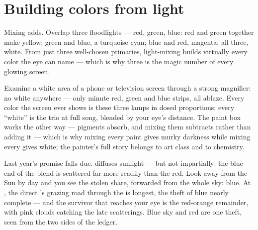 \section{Building colors from light}

\begin{example}\label{ex:g8:colors-spectra:additive}
Mixing \emph{} adds. Overlap three floodlights --- red,
green, blue: red and green together make yellow; green and
blue, a turquoise cyan; blue and red, magenta; all three,
white. From just three well-chosen primaries, light-mixing
builds virtually every color the eye can name --- which is why
three is the magic number of every glowing screen.
\end{example}

\begin{example}\label{ex:g8:colors-spectra:screen}
Examine a white area of a phone or television screen through a
strong magnifier: no white anywhere --- only minute red, green
and blue strips, all ablaze. Every color the screen ever
shows is these three lamps in dosed proportions; every
``white'' is the trio at full song, blended by your eye's
distance. The paint box works the other way --- pigments
absorb, and mixing them subtracts  rather than adding it
--- which is why mixing every paint gives murky darkness while
mixing every  gives white; the painter's full story
belongs to art class and to chemistry.
\end{example}

\begin{remark}\label{rem:g8:colors-spectra:sunset}
Last year's  promise falls due.  diffuses sunlight
--- but not impartially: the blue end of the blend is
scattered far more readily than the red. Look away from the
Sun by day and you see the stolen share, forwarded from the
whole sky: blue. At , the direct 's grazing road
through the  is longest, the theft of blue nearly
complete --- and the survivor that reaches your eye is the
red-orange remainder, with pink clouds catching the late
scatterings. Blue sky and red  are one theft, seen from
the two sides of the ledger.
\end{remark}

